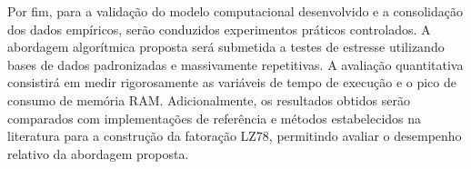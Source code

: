 \documentclass[licenciatura]{pre-projeto-computacao}
\begin{document}
Por fim, para a validação do modelo computacional desenvolvido e a consolidação dos dados empíricos, serão conduzidos experimentos práticos controlados.
A abordagem algorítmica proposta será submetida a testes de estresse utilizando bases de dados padronizadas e massivamente repetitivas. 
A avaliação quantitativa consistirá em medir rigorosamente as variáveis de tempo de execução e o pico de consumo de memória RAM.
Adicionalmente, os resultados obtidos serão comparados com implementações de referência e métodos estabelecidos na literatura para a construção da fatoração LZ78, permitindo avaliar o desempenho relativo da abordagem proposta.


\end{document}
